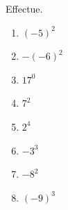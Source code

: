 %
%
  Effectue.
  \begin{enumerate}[cols=4]
    \item $( - 5)^{2}$
    \item $- ( - 6)^{2}$
    \item $17^{0}$
    \item $7^{2}$
    \item $2^{4}$
    \item $- 3^{3}$
    \item $- 8^{2}$
    \item $( - 9)^{3}$
  \end{enumerate}
